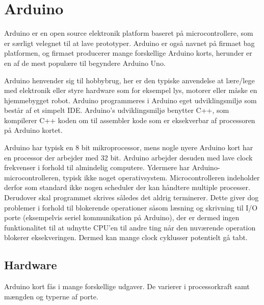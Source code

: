 


\section{Arduino}
Arduino er en open source elektronik platform baseret på microcontrollere, som er særligt velegnet til at lave prototyper. Arduino er også navnet på firmaet bag platformen, og firmaet producerer mange forskellige Arduino korts, herunder er en af de mest populære til begyndere Arduino Uno.

Arduino henvender sig til hobbybrug, her er den typiske anvendelse at lære/lege med elektronik eller styre hardware som for eksempel lys, motorer eller måske en hjemmebygget robot. Arduino programmeres i Arduino eget udviklingsmiljø som består af et simpelt IDE. Arduino's udviklingsmiljø benytter C++, som kompilerer C++ koden om til assembler kode som er eksekverbar af processoren på Arduino kortet.

Arduino har typisk en 8 bit mikroprocessor, mens nogle nyere Arduino kort har en processor der arbejder med 32 bit. Arduino arbejder desuden med lave clock frekvenser i forhold til almindelig computere. Ydermere har Arduino-microcontrolleren, typisk ikke noget operativsystem. Microcontrolleren indeholder derfor som standard ikke nogen scheduler der kan håndtere multiple processer. Derudover skal programmet skrives således det aldrig terminerer. Dette giver dog problemer i forhold til blokerende operationer såsom læsning og skrivning til I/O porte (eksempelvis seriel kommunikation på Arduino), der er dermed ingen funktionalitet til at udnytte CPU'en til andre ting når den nuværende operation blokerer eksekveringen. Dermed kan mange clock cyklusser potentielt gå tabt.

\subsection{Hardware}
Arduino kort fås i mange forskellige udgaver. De varierer i processorkraft samt mængden og typerne af porte.

